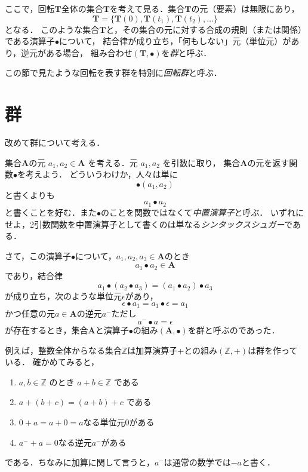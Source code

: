 \documentclass{jsbook}
\newcommand{\keyword}[1]{\emph{#1}}
\newcommand{\bop}[1]{\boldsymbol{#1}}
\newcommand{\bg}[1]{\mathbf{#1}}
\begin{document}
ここで，回転$\bop{T}$全体の集合$\bg{T}$を考えて見る．集合$\bg{T}$の元（要素）は無限にあり，
\begin{equation}
\bg{T}=\{\bop{T}(0),\bop{T}(t_1),\bop{T}(t_2),\dots\}
\end{equation}
となる．
このような集合$\bg{T}$と，その集合の元に対する合成の規則（または関係）である演算子$\bullet$について，
結合律が成り立ち，「何もしない」元（単位元）があり，逆元がある場合，
組み合わせ$(\bg{T},\bullet)$を\keyword{群}と呼ぶ．

この節で見たような回転を表す群を特別に\keyword{回転群}と呼ぶ．

\section{群}

改めて群について考える．

集合$\bg{A}$の元 $a_1,a_2\in\bg{A}$ を考える．元 $a_1,a_2$ を引数に取り，
集合$\bg{A}$の元を返す関数$\bullet$を考えよう．
どういうわけか，人々は単に
\begin{equation}
\bullet(a_1,a_2)
\end{equation}
と書くよりも
\begin{equation}
a_1\bullet a_2
\end{equation}
と書くことを好む．また$\bullet$のことを関数ではなくて\keyword{中置演算子}と呼ぶ．
いずれにせよ，2引数関数を中置演算子として書くのは単なる\keyword{シンタックスシュガー}である．

さて，この演算子$\bullet$について，$a_1,a_2,a_3\in\bg{A}$のとき
\begin{equation}
a_1\bullet a_2\in\bg{A}
\end{equation}
であり，結合律
\begin{equation}
a_1\bullet(a_2\bullet a_3)=(a_1\bullet a_2)\bullet a_3
\end{equation}
が成り立ち，次のような単位元$\epsilon$があり，
\begin{equation}
\epsilon\bullet a_1=a_1\bullet\epsilon=a_1
\end{equation}
かつ任意の元$a\in\bg{A}$の逆元$a^-$ただし
\begin{equation}
a^-\bullet a=\epsilon
\end{equation}
が存在するとき，集合$\bg{A}$と演算子$\bullet$の組み$(\bg{A},\bullet)$を群と呼ぶのであった．

例えば，整数全体からなる集合$\mathbb{Z}$は加算演算子$+$との組み$(\mathbb{Z},+)$は群を作っている．
確かめてみると，
\begin{enumerate}
\item $a,b\in\mathbb{Z}$ のとき $a+b\in\mathbb{Z}$ である
\item $a+(b+c)=(a+b)+c$ である
\item $0+a=a+0=a$なる単位元$0$がある
\item $a^{-}+a=0$なる逆元$a^{-}$がある
\end{enumerate}
である．ちなみに加算に関して言うと，$a^{-}$は通常の数学では$-a$と書く．
\end{document}
